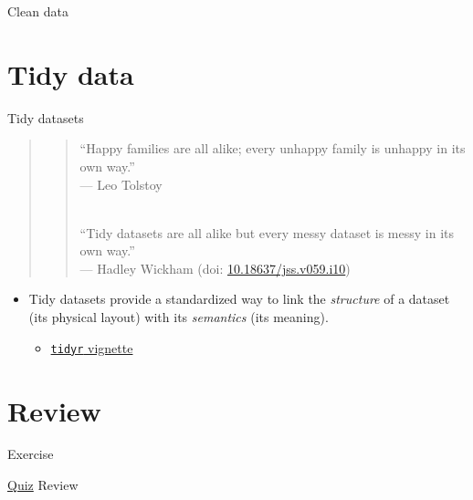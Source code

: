 \documentclass[
  11pt,
  ignorenonframetext,
]{beamer}
\providecommand{\tightlist}{%
  \setlength{\itemsep}{0pt}\setlength{\parskip}{0pt}}
\begin{document}
\begin{frame}{Clean data}
\end{frame}

\hypertarget{tidy-data}{%
\section{Tidy data}\label{tidy-data}}

\begin{frame}[fragile]{Tidy datasets}
\protect\hypertarget{tidy-datasets}{}
\begin{quote}
\begin{quote}
``Happy families are all alike; every unhappy family is unhappy in its
own way.''\\
--- Leo Tolstoy\\
\strut \\
``Tidy datasets are all alike but every messy dataset is messy in its
own way.''\\
--- Hadley Wickham (doi:
\href{https://doi.org/10.18637/jss.v059.i10}{10.18637/jss.v059.i10})
\end{quote}
\end{quote}

\begin{itemize}
\item
  Tidy datasets provide a standardized way to link the \emph{structure}
  of a dataset (its physical layout) with its \emph{semantics} (its
  meaning).

  \begin{itemize}
  \tightlist
  \item
    \href{https://cran.r-project.org/web/packages/tidyr/vignettes/tidy-data.html}{\texttt{tidyr}
    vignette}
  \end{itemize}
\end{itemize}
\end{frame}

\hypertarget{review}{%
\section{Review}\label{review}}

\begin{frame}{Exercise}
\protect\hypertarget{exercise}{}
\end{frame}

\begin{frame}[fragile]{\protect\hyperlink{pop-quiz}{Quiz} Review}
\protect\hypertarget{quiz-review}{}
\end{frame}
\end{document}
